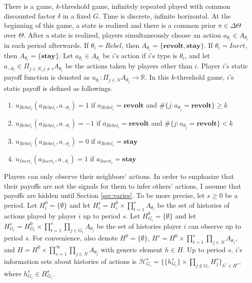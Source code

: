 \documentclass[12pt,letter]{article}
\theoremstyle{definition}
\theoremstyle{remark}
\theoremstyle{claim}
\begin{document}
There is a game, $k$-threshold game, infinitely repeated played with common discounted factor $\delta$ in a fixed $G$. Time is discrete, infinite horizontal. At the beginning of this game, a state is realized and there is a common prior $\pi\in \Delta \Theta$ over $\Theta$. After a state is realized, players simultaneously choose an action $a_{\theta_i}\in A_{\theta_i}$ in each period afterwards. If $\theta_i=Rebel$, then $A_{\theta_i}=\{\textbf{revolt}, \textbf{stay}\}$.  If $\theta_i=Inert$, then $A_{\theta_i}=\{\textbf{stay}\}$. Let $a_{\theta_i}\in A_{\theta_i}$ be $i$'s action if $i$'s type is $\theta_i$, and let $a_{-\theta_i}\in \Pi_{j\in N,j\neq i}A_{\theta_j}$ be the actions taken by players other than $i$. Player $i$'s static payoff function is denoted as $u_{\theta_i}: \Pi_{j\in N}A_{\theta_j}\rightarrow \mathbb{R}$. In this $k$-threshold game, $i$'s static payoff is defined as followings. 
\begin{enumerate}
\item $u_{Rebel_i}(a_{Rebel_i},a_{-\theta_i})=1$ if $a_{Rebel_i}=\textbf{revolt}$ and $\#\{j:a_{\theta_j}=\textbf{revolt}\}\geq k$
\item $u_{Rebel_i}(a_{Rebel_i},a_{-\theta_i})=-1$ if $a_{Rebel_i}=\textbf{revolt}$ and $\#\{j:a_{\theta_j}=\textbf{revolt}\}< k$
\item $u_{Rebel_i}(a_{Rebel_i},a_{-\theta_i})=0$ if $a_{Rebel_i}=\textbf{stay}$
\item $u_{Inert_i}(a_{Inert_i},a_{-\theta_i})=1$ if $a_{Inert_i}=\textbf{stay}$
\end{enumerate}

Players can only observe their neighbors' actions. In order to emphasize that their payoffs are not the signals for them to infer others' actions, I assume that payoffs are hidden until Section \ref{sec:varies}. To be more precise, let $s\geq 0$ be a period. Let $H^0_{i}=\{ \emptyset \}$ and let $H^s_{i}=H^0_{i}\times \prod^s_{t=1}A_{\theta_i}$ be the set of histories of actions played by player $i$ up to period $s$. Let $H^0_{G_i}=\{\emptyset\}$ and let $H^s_{G_i}=H^0_{G_i}\times \prod^s_{t=1}\prod_{j\in G_i}A_{\theta_j}$ be the set of histories player $i$ can observe up to period $s$.  For convenience, also denote $H^0=\{\emptyset\}$, $H^s=H^0\times \prod^s_{t=1}\prod_{j\in N}A_{\theta_j}$, and $H=H^0\times \prod^{\infty}_{s=1}\prod_{j\in N}A_{\theta_j}$ with generic element $h\in H$. Up to period $s$, $i$'s information sets about histories of actions is $\mathcal{H}^s_{G_i}=\{\{h^s_{G_i}\}\times \prod_{j\notin G_i}H^s_{j}\}_{h^s\in H^s}$, where $h^s_{G_i}\in H^s_{G_i}$.
\end{document}
